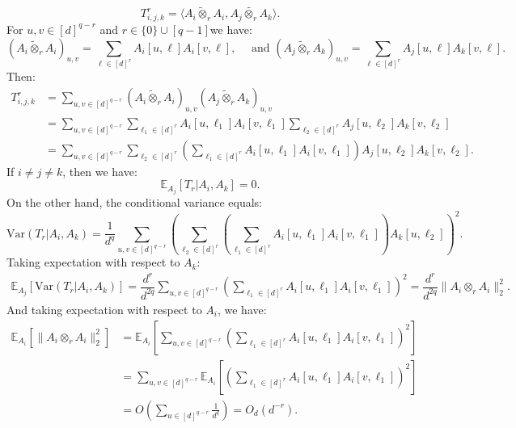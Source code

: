 \documentclass[]{article}
\numberwithin{equation}{section}
\theoremstyle{definition}
\newcommand{\EE}{\mathbb{E}}
\begin{document}
\begin{equation}
    T^{r}_{i,j,k}  =  \langle A_{i} \tilde{\otimes}_{r} A_i, A_j \tilde{\otimes_{r}} A_k \rangle. 
\end{equation}
For $u, v \in [d]^{q-r}$ and $r \in \{0\} \cup[q-1]$we have: 
\begin{equation}
     (A_{i} \tilde{\otimes}_{r} A_i)_{u,v} =  \sum_{\ell \in [d]^{r}} A_{i}[u, \ell] A_i [v, \ell ], \quad \text{ and } (A_{j} \tilde{\otimes}_{r} A_k)_{u,v} =  \sum_{\ell \in [d]^{r}} A_{j}[u, \ell] A_k [v, \ell ]. 
\end{equation}
Then: 
\begin{align}
    T^{r}_{i,j,k} & = \sum_{u,v \in [d]^{q-r}}  (A_{i} \tilde{\otimes}_{r} A_i)_{u,v} (A_{j} \tilde{\otimes}_{r} A_k)_{u,v} \\
    & = \sum_{u,v \in [d]^{q-r}}  \sum_{\ell_1 \in [d]^{r}} A_{i}[u, \ell_1] A_i [v, \ell_1 ] \sum_{\ell_2 \in [d]^{r}} A_{j}[u, \ell_2] A_k [v, \ell_2 ] \\
    & = \sum_{u,v \in [d]^{q-r}} \sum_{\ell_2 \in [d]^{r}} \left ( \sum_{\ell_1 \in [d]^{r}} A_{i}[u, \ell_1] A_i [v, \ell_1 ] \right )A_{j}[u, \ell_2] A_k [v, \ell_2 ]. 
\end{align}
If $i \not = j\not = k$, then we have: 
\begin{equation}
    \EE_{A_j} \left [ T_{r} | A_i, A_k\right ] = 0 . 
\end{equation}
On the other hand, the conditional variance equals: 
\begin{equation}
    \mathrm{Var} \left ( T_{r} | A_i, A_k\right) = \dfrac{1}{d^{q}} \sum_{u,v \in [d]^{q-r}} \left ( \sum_{\ell_2 \in [d]^{r}} \left ( \sum_{\ell_1 \in [d]^{r}} A_{i}[u, \ell_1] A_i [v, \ell_1 ] \right )A_{k}[u, \ell_2]\right )^{2}.
\end{equation}
Taking expectation with respect to $A_{k}$: 
\begin{align}
    \EE_{A_j} \left [ \mathrm{Var} \left ( T_{r} | A_i, A_k\right)\right] = \dfrac{d^{r}}{d^{2q}}\sum_{u,v \in [d]^{q-r}}\left ( \sum_{\ell_1 \in [d]^{r}} A_{i}[u, \ell_1] A_i [v, \ell_1 ] \right )^{2} = \dfrac{d^{r}}{d^{2q}} \| A_i \otimes_{r} A_i \|_{2}^{2}. 
\end{align}
And taking expectation with respect to $A_i$, we have: 
\begin{align}
    \EE_{A_i} \left [ \| A_i \otimes_{r} A_i \|_{2}^{2}\right] &=  \EE_{A_i} \left [ \sum_{u,v \in [d]^{q-r}}\left ( \sum_{\ell_1 \in [d]^{r}} A_{i}[u, \ell_1] A_i [v, \ell_1 ] \right )^{2}\right ] \\
    & = \sum_{u,v \in [d]^{q-r}} \EE_{A_i} \left [ \left (\sum_{\ell_1 \in [d]^{r}} A_{i}[u, \ell_1] A_i [v, \ell_1 ] \right )^{2} \right ] \\
    & =O\left ( \sum_{u \in [d]^{q-r}} \frac{1}{d^{q}}\right )  = O_{d}(d^{-r}).
    \label{eq:frobenius_norm_A_r_A}
\end{align}
\end{document}
